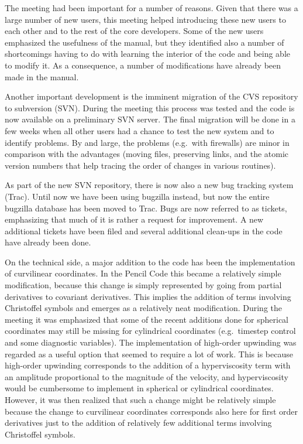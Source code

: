 \documentclass{article}
\begin{document}
The meeting had been important for a number of reasons.
Given that there was a large number of new users, this meeting
helped introducing these new users to each other and to the
rest of the core developers.
Some of the new users emphasized the usefulness of the manual,
but they identified also a number of shortcomings having to do
with learning the interior of the code and being able to modify it.
As a consequence, a number of modifications have already been made
in the manual.

Another important development is the imminent migration of the
CVS repository to subversion (SVN). During the meeting this
process was tested and the code is now available on a preliminary
SVN server.
The final migration will be done in a few weeks when all other
users had a chance to test the new system and to identify problems.
By and large, the problems (e.g.\ with firewalls) are minor in comparison
with the advantages (moving files, preserving links, and the atomic
version numbers that help tracing the order of changes in various
routines).

As part of the new SVN repository, there is now also a
new bug tracking system (Trac).
Until now we have been using bugzilla instead, but now the
entire bugzilla database has been moved to Trac.
Bugs are now referred to as tickets, emphasizing that much
of it is rather a request for improvement.
A new additional tickets have been filed and several
additional clean-ups in the code have already been done.

On the technical side, a major addition to the code has been the
implementation of curvilinear coordinates.
In the Pencil Code this became a relatively simple modification,
because this change is simply represented by going from
partial derivatives to covariant derivatives.
This implies the addition of terms involving Christoffel symbols
and emerges as a relatively neat modification.
During the meeting it was emphasized that some of the recent
additions done for spherical coordinates may still be missing
for cylindrical coordinates (e.g.\ timestep control and some
diagnostic variables).
The implementation of high-order upwinding was regarded as
a useful option that seemed to require a lot of work.
This is because high-order upwinding corresponds to
the addition of a hyperviscosity term with an amplitude
proportional to the magnitude of the velocity, and hyperviscosity
would be cumbersome to implement in spherical or cylindrical
coordinates.
However, it was then realized that such a change might be
relatively simple because the change to curvilinear coordinates
corresponds also here for first order derivatives just to the addition
of relatively few additional terms involving Christoffel symbols.
\end{document}
